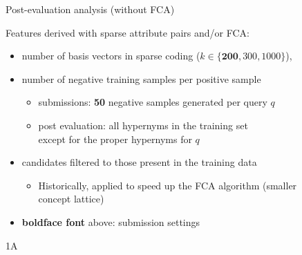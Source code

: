 \documentclass{beamer}
\newlength{\sepwid}
\newlength{\onecolwid}
\begin{document}
\begin{frame}[t]
\begin{columns}[t]
\begin{column}{\onecolwid}
\end{column}


\begin{column}{\sepwid} %
\end{column}

\begin{column}{\onecolwid} %


  \begin{block}{Post-evaluation analysis (without FCA)}

    Features derived with \alert{sparse attribute pairs} and/or \alert{FCA}:
    

    \begin{itemize}
      \item number of basis vectors in sparse coding ($k \in
        \{\mathbf{200}, 300, 1000\}$),
      \item number of \alert negative training \alert samples per positive sample
        \begin{itemize}
          \item submissions: \textbf{50} negative samples generated per query $q$
          \item post evaluation: all hypernyms in the training set
            \\ except for the proper hypernyms for $q$
        \end{itemize}
      \item candidates filtered to those present in the training data
        \begin{itemize}
          \item Historically, applied to speed up the FCA algorithm
            (smaller concept lattice)
        \end{itemize}
      \item \textbf{boldface font} above: submission settings
    \end{itemize}

  \end{block}
  \begin{block}{1A}
    


\end{block}
\end{column}
\end{columns}
\end{frame}
\end{document}
